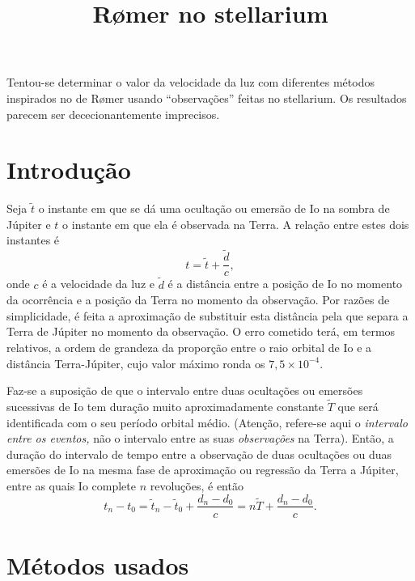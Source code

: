 \documentclass[]{article}
\title{R{\o}mer no stellarium}
\author{}
\begin{document}
\maketitle

\abstract
\noindent
Tentou-se determinar o valor da velocidade da luz com diferentes métodos
inspirados no de R{\o}mer usando ``observações'' feitas no stellarium. Os
resultados parecem ser dececionantemente imprecisos.


\section{Introdução}
Seja $\tilde t$ o instante em que se dá uma ocultação ou emersão de Io na sombra
de Júpiter e $t$ o instante em que ela é observada na Terra. A relação entre
estes dois instantes é
\begin{equation}
  t=\tilde t+\frac{\tilde d}{c},
\end{equation}
onde $c$ é a velocidade da luz e $\tilde d$ é a distância entre a posição de Io no
momento da ocorrência e a posição da Terra no momento da observação. Por razões
de simplicidade, é feita a aproximação de substituir esta distância pela que
separa a Terra de Júpiter no momento da observação. O erro cometido terá, em
termos relativos, a ordem de grandeza da proporção entre o raio orbital de Io e
a distância Terra-Júpiter, cujo valor máximo ronda os $7,5\times10^{-4}$.

Faz-se a suposição de que o intervalo entre duas ocultações ou emersões
sucessivas de Io tem duração muito aproximadamente constante $\tilde T$ que será
identificada com o seu período orbital médio.  (Atenção, refere-se aqui o
\emph{intervalo entre os eventos,} não o intervalo entre as suas
\emph{observações} na Terra). Então, a duração do intervalo de tempo entre a
observação de duas ocultações ou duas emersões de Io na mesma fase de
aproximação ou regressão da Terra a Júpiter, entre as quais Io complete $n$
revoluções, é então
\begin{equation}\label{eq:aa}
  t_n-t_0=\tilde t_n-\tilde t_0 + \frac{d_n-d_0}{c}=n\tilde T+
  \frac{d_n-d_0}{c}.
\end{equation}

\section{Métodos usados}
\end{document}
